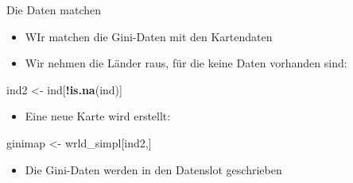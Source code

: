 \documentclass[ignorenonframetext,]{beamer}
\newenvironment{Shaded}{\begin{snugshade}}{\end{snugshade}}
\newcommand{\KeywordTok}[1]{\textcolor[rgb]{0.13,0.29,0.53}{\textbf{#1}}}
\newcommand{\NormalTok}[1]{#1}
\newcommand{\OperatorTok}[1]{\textcolor[rgb]{0.81,0.36,0.00}{\textbf{#1}}}
\newcommand{\StringTok}[1]{\textcolor[rgb]{0.31,0.60,0.02}{#1}}
\providecommand{\tightlist}{%
  \setlength{\itemsep}{0pt}\setlength{\parskip}{0pt}}
\begin{document}
\begin{frame}[fragile]{Die Daten matchen}
\protect\hypertarget{die-daten-matchen}{}

\begin{itemize}
\tightlist
\item
  WIr matchen die Gini-Daten mit den Kartendaten
\end{itemize}

\begin{Shaded}
\end{Shaded}

\begin{itemize}
\tightlist
\item
  Wir nehmen die Länder raus, für die keine Daten vorhanden sind:
\end{itemize}

\begin{Shaded}
\begin{Highlighting}[]
\NormalTok{ind2 <-}\StringTok{ }\NormalTok{ind[}\OperatorTok{!}\KeywordTok{is.na}\NormalTok{(ind)]}
\end{Highlighting}
\end{Shaded}

\begin{itemize}
\tightlist
\item
  Eine neue Karte wird erstellt:
\end{itemize}

\begin{Shaded}
\begin{Highlighting}[]
\NormalTok{ginimap <-}\StringTok{ }\NormalTok{wrld_simpl[ind2,]}
\end{Highlighting}
\end{Shaded}

\begin{itemize}
\tightlist
\item
  Die Gini-Daten werden in den Datenslot geschrieben
\end{itemize}

\begin{Shaded}
\end{Shaded}

\end{frame}
\end{document}
